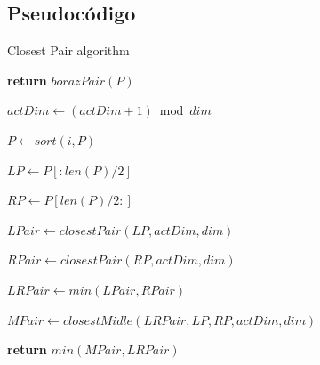 \documentclass{article}
\begin{document}
	\subsection{Pseudocódigo}
		\begin{algorithm}

			\caption{Closest Pair algorithm}

			\label{euclid}

			\begin{algorithmic}[1] %

			
					
					\State \textbf{return}  $borazPair(P)$

				\Else
					
					\State $actDim\gets(actDim+1) \bmod dim$ 	
					
					\State

					
					\State $P \gets sort(i, P)$
					
					\State
					
					\State $LP \gets P[:len(P)/2]$
					
					\State $RP \gets P[len(P)/2:]$
					
					\State
					
					\State $LPair \gets closestPair(LP, actDim, dim)$
					
					\State $RPair \gets closestPair(RP, actDim, dim)$
					
					\State $LRPair \gets min(LPair, RPair)$
					
					\State
					
					\State $MPair \gets closestMidle(LRPair, LP, RP, actDim, dim)$
					
					\State

					\State \textbf{return} $min(MPair, LRPair)$
				\EndIf
			
			\EndProcedure

			\end{algorithmic}

		\end{algorithm}
		
\end{document}

